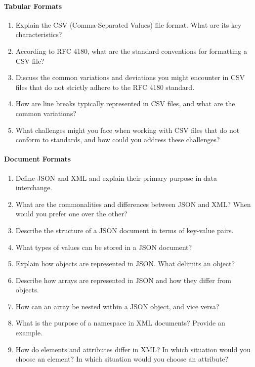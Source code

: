 \paragraph*{Tabular Formats}
\begin{enumerate}
    \item Explain the CSV (Comma-Separated Values) file format. What are its key characteristics?
    \item According to RFC 4180, what are the standard conventions for formatting a CSV file?
    \item Discuss the common variations and deviations you might encounter in CSV files that do not strictly adhere to the RFC 4180 standard.
    \item How are line breaks typically represented in CSV files, and what are the common variations?
    \item What challenges might you face when working with CSV files that do not conform to standards, and how could you address these challenges?
\end{enumerate}
\paragraph*{Document Formats}
\begin{enumerate}
    \item Define JSON and XML and explain their primary purpose in data interchange.
    \item What are the commonalities and differences between JSON and XML? When would you prefer one over the other?
    \item Describe the structure of a JSON document in terms of key-value pairs.
    \item What types of values can be stored in a JSON document?
    \item Explain how objects are represented in JSON. What delimits an object?
    \item Describe how arrays are represented in JSON and how they differ from objects.
    \item How can an array be nested within a JSON object, and vice versa?
    \item What is the purpose of a namespace in XML documents? Provide an example.
    \item How do elements and attributes differ in XML? In which situation would you choose an element? In which situation would you choose an attribute?
\end{enumerate}
